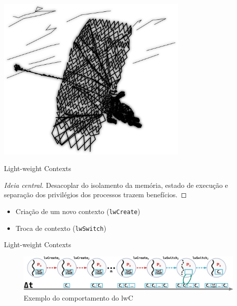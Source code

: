 \documentclass[xcolor={usenames,svgnames,dvipsnames},brazil,english,12pt,aspectratio=149]{beamer}
\begin{document}
\begin{frame}[plain]
  \includegraphics[width=0.7\textwidth]{presentation_cap2_eight}
\end{frame}

\begin{frame}{Light-weight Contexts}

  \begin{proof}[Ideia central]
Desacoplar do isolamento da memória, estado de execução e separação dos
privilégios dos processos trazem benefícios.
  \end{proof}

  \begin{itemize}
    \item Criação de um novo contexto (\texttt{lwCreate})
    \item Troca de contexto (\texttt{lwSwitch})
  \end{itemize}

\end{frame}

\begin{frame}{Light-weight Contexts}
  \begin{figure}[!h]
    \centering
    \includegraphics[width=\textwidth]{lwC} 
    \caption{Exemplo do comportamento do lwC}
    \label{fig:lwc} 
  \end{figure}
\end{frame}
\end{document}
